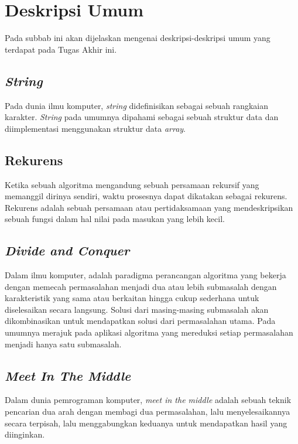 \section{Deskripsi Umum}
Pada subbab ini akan dijelaskan  mengenai deskripsi-deskripsi umum yang terdapat pada Tugas Akhir ini.

\subsection{\textit{String}}
\label{subsec:string}
Pada dunia ilmu komputer, \textit{string} didefinisikan sebagai sebuah rangkaian karakter. \textit{String} pada umumnya dipahami sebagai sebuah struktur data dan diimplementasi menggunakan struktur data \textit{array}\cite{string}.

\subsection{Rekurens}
\label{subsec:rekurens}
Ketika sebuah algoritma mengandung sebuah persamaan rekursif yang memanggil dirinya sendiri, waktu prosesnya dapat dikatakan sebagai rekurens. Rekurens adalah sebuah persamaan atau pertidaksamaan yang mendeskripsikan sebuah fungsi dalam hal nilai pada masukan yang lebih kecil\cite{cormen}.

\subsection{\textit{Divide and Conquer}}
\label{subsec:divide_and_conquer}
Dalam ilmu komputer, \dc{} adalah paradigma perancangan algoritma yang bekerja dengan memecah permasalahan menjadi dua atau lebih submasalah dengan karakteristik yang sama atau berkaitan hingga cukup sederhana untuk diselesaikan secara langsung. Solusi dari masing-masing submasalah akan dikombinasikan untuk mendapatkan solusi dari permasalahan utama. Pada umumnya \dc{} merajuk pada aplikasi algoritma yang mereduksi setiap permasalahan menjadi hanya satu submasalah\cite{cp3}.

\subsection{\textit{Meet In The Middle}}
\label{subsec:meet_in_the_middle}
Dalam dunia pemrograman komputer, \textit{meet in the middle} adalah sebuah teknik pencarian dua arah dengan membagi dua permasalahan, lalu menyelesaikannya secara terpisah, lalu menggabungkan keduanya untuk mendapatkan hasil yang diinginkan\cite{cp3}.

